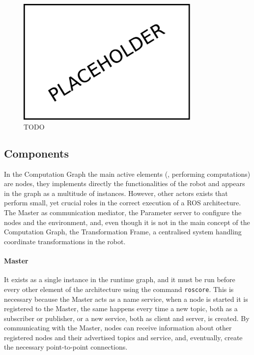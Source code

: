 \begin{figure}[t]
    \centering
    \includegraphics[width=0.8\textwidth]{gfx/placeholder}
    \caption{TODO}\label{fig:ros-master}
\end{figure}

\subsection{Components}
In the Computation Graph the main active elements (\ie, performing computations) are nodes, they implements directly the functionalities of the robot and appears in the graph as a multitude of instances. However, other actors exists that perform small, yet crucial roles in the correct execution of a ROS architecture. The Master as communication mediator, the Parameter server to configure the nodes and the environment, and, even though it is not in the main concept of the Computation Graph, the Transformation Frame, a centralised system handling coordinate transformations in the robot.

\paragraph{Master} It exists as a single instance in the runtime graph, and it must be run before every other element of the architecture using the command \texttt{roscore}. This is necessary because the Master acts as a name service, when a node is started it is registered to the Master, the same happens every time a new topic, both as a subscriber or publisher, or a new service, both as client and server,  is created. By communicating with the Master, nodes can receive information about other registered nodes and their advertised topics and service, and, eventually, create the necessary point-to-point connections.

